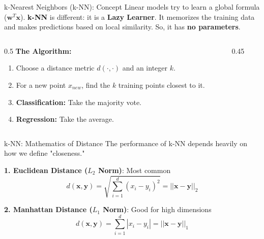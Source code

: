\begin{frame}{k-Nearest Neighbors (k-NN): Concept}
    Linear models try to learn a global formula ($\mathbf{w}^T\mathbf{x}$). 
    \textbf{k-NN} is different: it is a \textbf{Lazy Learner}. It memorizes the training data and makes predictions based on local similarity. So, it has \textbf{no parameters}.

    \begin{columns}[c]
        \begin{column}{0.5\textwidth}
            \textbf{The Algorithm:}
            \begin{enumerate}
                \item Choose a distance metric $d(\cdot, \cdot)$ and an integer $k$.
                \item For a new point $x_{new}$, find the $k$ training points closest to it.
                \item \textbf{Classification:} Take the majority vote.
                \item \textbf{Regression:} Take the average.
            \end{enumerate}
        \end{column}
        \begin{column}{0.45\textwidth}
            \centering
        \end{column}
    \end{columns}
\end{frame}

\begin{frame}{k-NN: Mathematics of Distance}
    The performance of k-NN depends heavily on how we define "closeness."
    
    \vspace{1em}
    \textbf{1. Euclidean Distance ($L_2$ Norm)}: Most common
    $$ d(\mathbf{x}, \mathbf{y}) = \sqrt{\sum_{i=1}^d (x_i - y_i)^2} = ||\mathbf{x} - \mathbf{y}||_2 $$
    
    \textbf{2. Manhattan Distance ($L_1$ Norm)}: Good for high dimensions
    $$ d(\mathbf{x}, \mathbf{y}) = \sum_{i=1}^d |x_i - y_i| = ||\mathbf{x} - \mathbf{y}||_1 $$

\end{frame}

